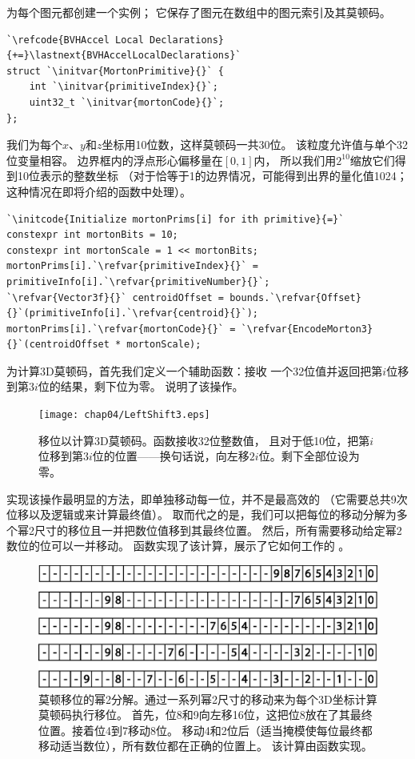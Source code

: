 为每个图元都创建一个实例；
它保存了图元在数组中的图元索引及其莫顿码。
\begin{lstlisting}
`\refcode{BVHAccel Local Declarations}{+=}\lastnext{BVHAccelLocalDeclarations}`
struct `\initvar{MortonPrimitive}{}` {
    int `\initvar{primitiveIndex}{}`;
    uint32_t `\initvar{mortonCode}{}`;
};
\end{lstlisting}

我们为每个$x$、$y$和$z$坐标用10位数，这样莫顿码一共30位。
该粒度允许值与单个32位变量相容。
边界框内的浮点形心偏移量在$[0,1]$内，
所以我们用$2^{10}$缩放它们得到10位表示的整数坐标
（对于恰等于1的边界情况，可能得到出界的量化值1024；
这种情况在即将介绍的函数中处理）。
\begin{lstlisting}
`\initcode{Initialize mortonPrims[i] for ith primitive}{=}`
constexpr int mortonBits = 10;
constexpr int mortonScale = 1 << mortonBits;
mortonPrims[i].`\refvar{primitiveIndex}{}` = primitiveInfo[i].`\refvar{primitiveNumber}{}`;
`\refvar{Vector3f}{}` centroidOffset = bounds.`\refvar{Offset}{}`(primitiveInfo[i].`\refvar{centroid}{}`);
mortonPrims[i].`\refvar{mortonCode}{}` = `\refvar{EncodeMorton3}{}`(centroidOffset * mortonScale);
\end{lstlisting}

为计算3D莫顿码，首先我们定义一个辅助函数：接收
一个32位值并返回把第$i$位移到第$3i$位的结果，剩下位为零。
说明了该操作。
\begin{figure}[htbp]
    \centering\texttt{[image: chap04/LeftShift3.eps]}
    \caption{移位以计算3D莫顿码。函数接收32位整数值，
        且对于低10位，把第$i$位移到第$3i$位的位置——换句话说，向左移$2i$位。剩下全部位设为零。}
    \label{fig:4.9}
\end{figure}

实现该操作最明显的方法，即单独移动每一位，并不是最高效的
（它需要总共9次位移以及逻辑或来计算最终值）。
取而代之的是，我们可以把每位的移动分解为多个幂2尺寸的移位且一并把数位值移到其最终位置。
然后，所有需要移动给定幂2数位的位可以一并移动。
函数实现了该计算，展示了它如何工作的
。
\begin{figure}[htbp]
    \centering\includegraphics[width=0.75\linewidth]{Pictures/chap04/Mortonpow2decomposition.eps}
    \caption{莫顿移位的幂2分解。通过一系列幂2尺寸的移动来为每个3D坐标计算莫顿码执行移位。
        首先，位8和9向左移16位，这把位8放在了其最终位置。接着位4到7移动8位。
        移动4和2位后（适当掩模使每位最终都移动适当数位），所有数位都在正确的位置上。
        该计算由函数实现。}
    \label{fig:4.10}
\end{figure}


